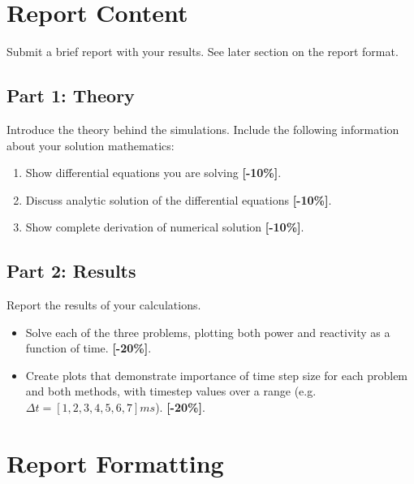 \documentclass{article}
\begin{document}
\section{Report Content}
Submit a brief report with your results. 
See later section on the report format.

\subsection{Part 1: Theory}
Introduce the theory behind the simulations. Include the following information 
about your solution mathematics:

\begin{enumerate}
        \item Show differential equations you are solving  {\color{red}\textbf{[-10\%]}}.
        \item Discuss analytic solution of the differential equations  {\color{red}\textbf{[-10\%]}}.
        \item Show complete derivation of numerical solution {\color{red}\textbf{[-10\%]}}.
\end{enumerate}

\subsection{Part 2: Results}

Report the results of your calculations.

\begin{itemize}
        \item Solve each of the three problems, 
                plotting both power and reactivity as a function of time.  
                {\color{red}\textbf{[-20\%]}}.
        \item Create plots that demonstrate importance of time step size for 
                each problem and both methods, with timestep values over a 
                range (e.g. $\Delta t = [1,2,3,4,5,6,7] ms$).
                {\color{red}\textbf{[-20\%]}}.
\end{itemize}

\section{Report Formatting}
\end{document}
